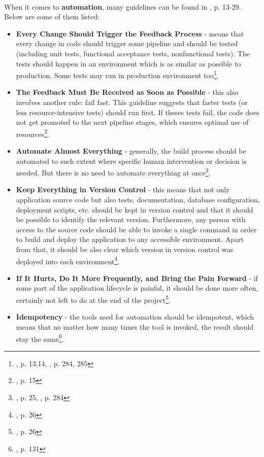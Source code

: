 \begin{itemize}
\paragraph{}
When it comes to \textbf{automation}, many guidelines can be found in \cite{book-cicd}, p. 13-29. Below are some of them listed:
\begin{itemize}
\item \textbf{Every Change Should Trigger the Feedback Process} - means that every change in code should trigger some pipeline and should be tested (including unit tests, functional acceptance tests, nonfunctional tests). The tests should happen in an environment which is as similar as possible to production. Some tests may run in production environment too\footnote{\cite{book-cicd}, p. 13,14, \cite{book-iac}, p. 284, 285}.
\item \textbf{The Feedback Must Be Received as Soon as Possible} - this also involves another rule: fail fast. This guideline suggests that faster tests (or less resource-intensive tests) should run first. If theses tests fail, the code does not get promoted to the next pipeline stages, which ensures optimal use of resources\footnote{\cite{book-cicd}, p. 15}.
\item \textbf{Automate Almost Everything} - generally, the build process should be automated to such extent where specific human intervention or decision is needed. But there is no need to automate everything at once\footnote{\cite{book-cicd}, p. 25, \cite{book-iac}, p. 284}.
\item \textbf{Keep Everything in Version Control} - this means that not only application source code but also tests, documentation, database configuration, deployment scripts, etc. should be kept in version control and that it should be possible to identify the relevant version. Furthermore, any person with access to the source code should be able to invoke a single command in order to build and deploy the application to any accessible environment. Apart from that, it should be also clear which version in version control was deployed into each environment\footnote{\cite{book-cicd}, p. 26}.
\item \textbf{If It Hurts, Do It More Frequently, and Bring the Pain Forward} - if some part of the application lifecycle is painful, it should be done more often, certainly not left to do at the end of the project\footnote{\cite{book-cicd}, p. 26}.
\item \textbf{Idempotency} - the tools used for automation should be idempotent, which means that no matter how many times the tool is invoked, the result should stay the same\footnote{\cite{book-iac}, p. 131}.
\end{itemize}


\end{itemize}
